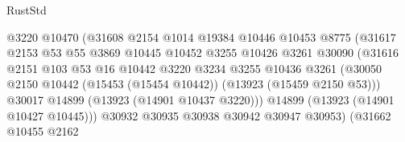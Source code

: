 \begin{lexlean}{RustStd}
\begin{coremodule}
                                        @3220
                                        @10470
                                        (@31608
                                          @2154
                                          @1014
                                          @19384
                                          @10446
                                          @10453
                                          @8775
                                          (@31617
                                            @2153
                                            @53
                                            @55
                                            @3869
                                            @10445
                                            @10452
                                            @3255
                                            @10426
                                            @3261
                                            @30090
                                            (@31616
                                              @2151
                                              @103
                                              @53
                                              @16
                                              @10442
                                              @3220
                                              @3234
                                              @3255
                                              @10436
                                              @3261
                                              (@30050
                                                @2150
                                                @10442
                                                (@15453 (@15454 @10442))
                                                (@13923 (@15459 @2150 @53)))
                                              @30017
                                              @14899
                                              (@13923 (@14901 @10437 @3220)))
                                            @14899
                                            (@13923 (@14901 @10427 @10445)))
                                          @30932
                                          @30935
                                          @30938
                                          @30942
                                          @30947
                                          @30953)
                                        (@31662
                                          @10455
                                          @2162

\end{coremodule}
\end{lexlean}
